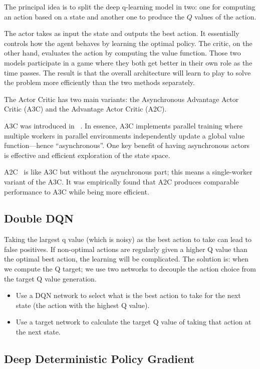 \documentclass[letterpaper, 10 pt]{IEEEconf}
\begin{document}
The principal idea is to split the deep q-learning model in two: one
for computing an action based on a state and another one to produce
the $Q$ values of the action.

The actor takes as input the state and outputs the best action. It
essentially controls how the agent behaves by learning the optimal
policy. The critic, on the other hand, evaluates the action by
computing the value function. Those two models participate in a game
where they both get better in their own role as the time passes. The
result is that the overall architecture will learn to play to solve
the problem more efficiently than the two methods separately.

The Actor Critic has two main variants: the Asynchronous Advantage
Actor Critic (A3C) and the Advantage Actor Critic (A2C).

A3C was introduced in ~\cite{mnih2016asynchronous}. In essence, A3C
implements parallel training where multiple workers in parallel
environments independently update a global value function—hence
``asynchronous''. One key benefit of having asynchronous actors is
effective and efficient exploration of the state space.

A2C~\cite{wu_2017} is like A3C but without the asynchronous part; this
means a single-worker variant of the A3C. It was empirically found
that A2C produces comparable performance to A3C while being more
efficient.

\subsection{Double DQN~\cite{NIPS2010_3964}}

Taking the largest q value (which is noisy) as the best action to take
can lead to false positives. If non-optimal actions are regularly
given a higher Q value than the optimal best action, the learning will
be complicated.  The solution is: when we compute the Q target; we use
two networks to decouple the action choice from the target Q value
generation.

\begin{itemize}
\item Use a DQN network to select what is the best action to take for
  the next state (the action with the highest Q value).
\item Use a target network to calculate the target Q value of taking
  that action at the next state.
\end{itemize}

\subsection{Deep Deterministic Policy Gradient~\cite{lillicrap2015continuous}}
\end{document}
